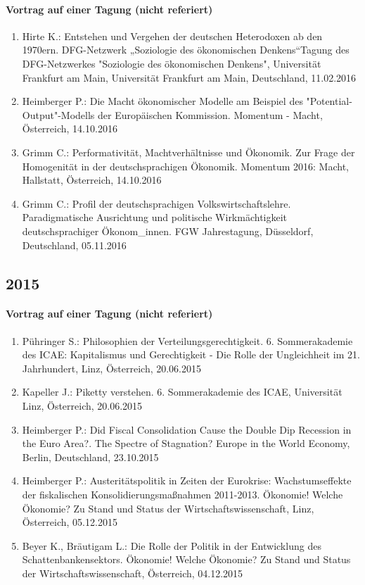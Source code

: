 \paragraph{Vortrag auf einer Tagung (nicht referiert)}
\begin{enumerate}
	\item Hirte K.: Entstehen und Vergehen der deutschen Heterodoxen ab den 1970ern. DFG-Netzwerk „Soziologie des ökonomischen Denkens“Tagung des DFG-Netzwerkes "Soziologie des ökonomischen Denkens", Universität Frankfurt am Main, Universität Frankfurt am Main, Deutschland, 11.02.2016
	\item Heimberger P.: Die Macht ökonomischer Modelle am Beispiel des "Potential-Output"-Modells der Europäischen Kommission. Momentum - Macht, Österreich, 14.10.2016
	\item Grimm C.: Performativität, Machtverhältnisse und Ökonomik. Zur Frage der Homogenität in der deutschsprachigen Ökonomik. Momentum 2016: Macht, Hallstatt, Österreich, 14.10.2016
	\item Grimm C.: Profil der deutschsprachigen Volkswirtschaftslehre. Paradigmatische Ausrichtung und politische Wirkmächtigkeit deutschsprachiger Ökonom_innen. FGW Jahrestagung, Düsseldorf, Deutschland, 05.11.2016
\end{enumerate}
\subsection*{2015}

    \paragraph{Vortrag auf einer Tagung (nicht referiert)}
\begin{enumerate}
	\item Pühringer S.: Philosophien der Verteilungsgerechtigkeit. 6. Sommerakademie des ICAE: Kapitalismus und Gerechtigkeit - Die Rolle der Ungleichheit im 21. Jahrhundert, Linz, Österreich, 20.06.2015
	\item Kapeller J.: Piketty verstehen. 6. Sommerakademie des ICAE, Universität Linz, Österreich, 20.06.2015
	\item Heimberger P.: Did Fiscal Consolidation Cause the Double Dip Recession in the Euro Area?. The Spectre of Stagnation? Europe in the World Economy, Berlin, Deutschland, 23.10.2015
	\item Heimberger P.: Austeritätspolitik in Zeiten der Eurokrise: Wachstumseffekte der fiskalischen Konsolidierungsmaßnahmen 2011-2013. Ökonomie! Welche Ökonomie? Zu Stand und Status der Wirtschaftswissenschaft, Linz, Österreich, 05.12.2015
	\item Beyer K., Bräutigam L.: Die Rolle der Politik in der Entwicklung des Schattenbankensektors. Ökonomie! Welche Ökonomie? Zu Stand und Status der Wirtschaftswissenschaft, Österreich, 04.12.2015
\end{enumerate}
